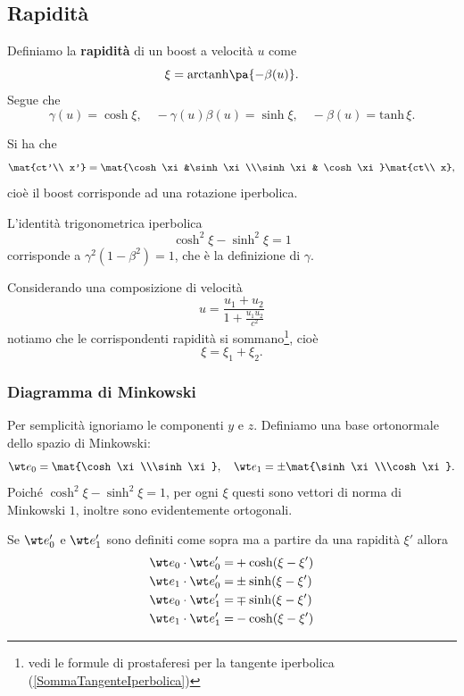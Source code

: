 \subsection{Rapidit\`a}

\begin{definition}[Rapidit\`a]
Definiamo la \textbf{rapidit\`a} di un boost a velocit\`a $u$ come
\[\xi=\mathrm{arctanh}\pa{-\beta(u)}.\]
Segue che
\[\gamma(u)=\cosh\xi,\quad -\gamma(u)\beta(u)=\sinh\xi,\quad -\beta(u)=\mathrm{tanh}\, \xi.\]
\end{definition}
\begin{remark}
Si ha che
\[\mat{ct'\\ x'}=\mat{\cosh \xi &\sinh \xi\\\sinh \xi & \cosh \xi}\mat{ct\\ x},\]
cio\`e il boost corrisponde ad una rotazione iperbolica.
\end{remark}
\begin{remark}
L'identit\`a trigonometrica iperbolica
\[\cosh^2\xi-\sinh^2\xi=1\]
corrisponde a $\gamma^2(1-\beta^2)=1$, che \`e la definizione di $\gamma$.
\end{remark}


\begin{remark}
Considerando una composizione di velocit\`a 
\[u=\dfrac{u_1+u_2}{1+\frac{u_1u_2}{c^2}}\]
notiamo che le corrispondenti rapidit\`a si sommano\footnote{vedi le formule di prostaferesi per la tangente iperbolica (\ref{SommaTangenteIperbolica})}, cio\`e
\[\xi=\xi_1+\xi_2.\]
\end{remark}


\subsubsection{Diagramma di Minkowski}
Per semplicit\`a ignoriamo le componenti $y$ e $z$. Definiamo una base ortonormale dello spazio di Minkowski:
\[\wt e_0=\mat{\cosh \xi\\\sinh\xi},\quad \wt e_1=\pm \mat{\sinh \xi\\\cosh\xi}.\]
Poich\'e $\cosh^2\xi-\sinh^2\xi=1$, per ogni $\xi$ questi sono vettori di norma di Minkowski $1$, inoltre sono evidentemente ortogonali.
\bigskip

\noindent
Se $\wt e_0'$ e $\wt e_1'$ sono definiti come sopra ma a partire da una rapidit\`a $\xi'$ allora
\begin{align*}
\wt e_0\cdot \wt e_0'=&+\cosh(\xi-\xi')\\
\wt e_1\cdot \wt e_0'=&\pm \sinh(\xi-\xi')\\
\wt e_0\cdot \wt e_1'=&\mp\sinh(\xi-\xi')\\
\wt e_1\cdot \wt e_1'=&-\cosh(\xi-\xi')
\end{align*}

